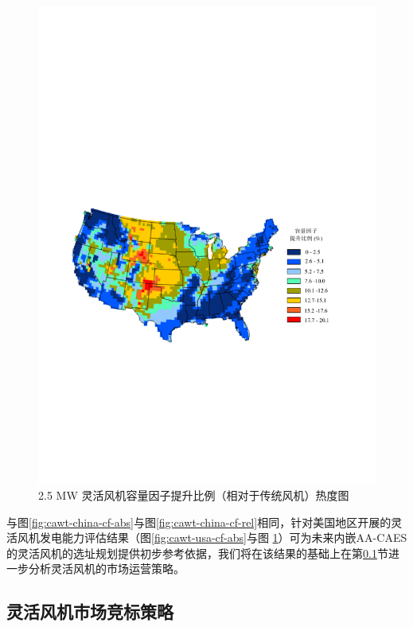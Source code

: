 \begin{figure}[!htp] %
  \centering
  \includegraphics[scale=0.85]{figures/Chap5-9-CA-WT-25-VDM2-Rel-2.pdf}
  \caption{2.5 MW 灵活风机容量因子提升比例（相对于传统风机）热度图}
  \label{fig:cawt-usa-cf-rel}
\end{figure}

与图\ref{fig:cawt-china-cf-abs}与图\ref{fig:cawt-china-cf-rel}相同，针对美国地区开展的灵活风机发电能力评估结果（图\ref{fig:cawt-usa-cf-abs}与图
\ref{fig:cawt-usa-cf-rel}）可为未来内嵌AA-CAES的灵活风机的选址规划提供初步参考依据，我们将在该结果的基础上在第\ref{sec:ca-wt-bid-market}节进一步分析灵活风机的市场运营策略。

\subsection{灵活风机市场竞标策略}
\label{sec:ca-wt-bid-market}
